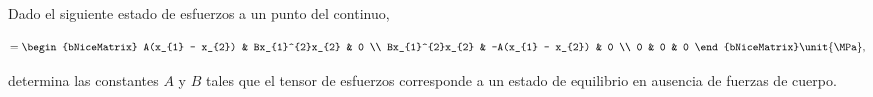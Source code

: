 \documentclass[../main.tex]{subfiles}
\begin{document}
\begin{problema}
	Dado el siguiente estado de esfuerzos a un punto del continuo,

	\begin{equation*}
		[\sigma] = \begin{bNiceMatrix}
			A(x_{1} - x_{2}) & Bx_{1}^{2}x_{2}   & 0 \\
			Bx_{1}^{2}x_{2}  & -A(x_{1} - x_{2}) & 0 \\
			0                & 0                 & 0
		\end{bNiceMatrix}
		\unit{\MPa},
	\end{equation*}

	determina las constantes \(A\) y \(B\) tales que el tensor de esfuerzos
	corresponde a un estado de equilibrio en ausencia de fuerzas de
	cuerpo.
\end{problema}
\end{document}
